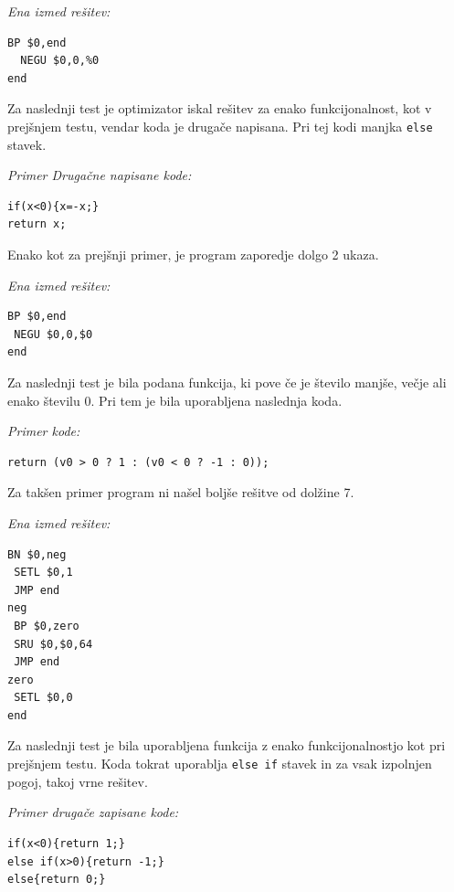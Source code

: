 \documentclass[a4paper, 12pt]{book}
\begin{document}
\medskip

\noindent
{\it Ena izmed rešitev:}
\begin{Verbatim}[baselinestretch=1]
  BP $0,end
  NEGU $0,0,%0
end
\end{Verbatim}

Za naslednji test je optimizator iskal rešitev za enako funkcijonalnost, kot v prejšnjem testu, vendar koda je drugače napisana. Pri tej kodi manjka \texttt{else} stavek.

\medskip

\noindent
{\it Primer Drugačne napisane kode:}
\begin{Verbatim}[baselinestretch=1]
if(x<0){x=-x;}
return x;
\end{Verbatim}

Enako kot za prejšnji primer, je program zaporedje dolgo 2 ukaza.

\medskip

\noindent
{\it Ena izmed rešitev:}
\begin{Verbatim}[baselinestretch=1]
 BP $0,end
 NEGU $0,0,$0
end
\end{Verbatim}

Za naslednji test je bila podana funkcija, ki pove če je število manjše, večje ali enako številu 0. Pri tem je bila uporabljena naslednja koda.


\medskip

\noindent
{\it Primer kode:}
\begin{Verbatim}[baselinestretch=1]
return (v0 > 0 ? 1 : (v0 < 0 ? -1 : 0));
\end{Verbatim}

Za takšen primer program ni našel boljše rešitve od dolžine 7.

\medskip

\noindent
{\it Ena izmed rešitev:}
\begin{Verbatim}[baselinestretch=1]
 BN $0,neg
 SETL $0,1
 JMP end
neg 
 BP $0,zero
 SRU $0,$0,64
 JMP end
zero 
 SETL $0,0
end

\end{Verbatim}

Za naslednji test je bila uporabljena funkcija z enako funkcijonalnostjo kot pri prejšnjem testu. Koda tokrat uporablja \texttt{else if} stavek in za vsak izpolnjen pogoj, takoj vrne rešitev.


\medskip

\noindent
{\it Primer drugače zapisane kode:}
\begin{Verbatim}[baselinestretch=1]
if(x<0){return 1;}
else if(x>0){return -1;}
else{return 0;}
\end{Verbatim}
\end{document}
